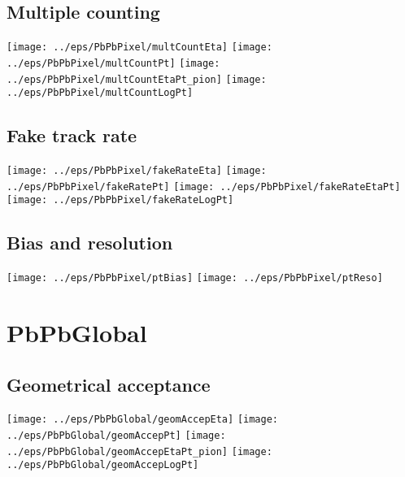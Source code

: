 \documentclass[landscape]{article}
\begin{document}
\subsection{Multiple counting}
 \texttt{[image: ../eps/PbPbPixel/multCountEta]}
 \texttt{[image: ../eps/PbPbPixel/multCountPt]}
 \texttt{[image: ../eps/PbPbPixel/multCountEtaPt\_pion]}
 \texttt{[image: ../eps/PbPbPixel/multCountLogPt]}
 \newpage

\subsection{Fake track rate}
 \texttt{[image: ../eps/PbPbPixel/fakeRateEta]}
 \texttt{[image: ../eps/PbPbPixel/fakeRatePt]}
 \texttt{[image: ../eps/PbPbPixel/fakeRateEtaPt]}
 \texttt{[image: ../eps/PbPbPixel/fakeRateLogPt]}
 \newpage

\subsection{Bias and resolution}
 \texttt{[image: ../eps/PbPbPixel/ptBias]}
 \texttt{[image: ../eps/PbPbPixel/ptReso]}
 \newpage
\section{PbPbGlobal}

\subsection{Geometrical acceptance}
 \texttt{[image: ../eps/PbPbGlobal/geomAccepEta]}
 \texttt{[image: ../eps/PbPbGlobal/geomAccepPt]}
 \texttt{[image: ../eps/PbPbGlobal/geomAccepEtaPt\_pion]}
 \texttt{[image: ../eps/PbPbGlobal/geomAccepLogPt]}
 \newpage
 
\end{document}

